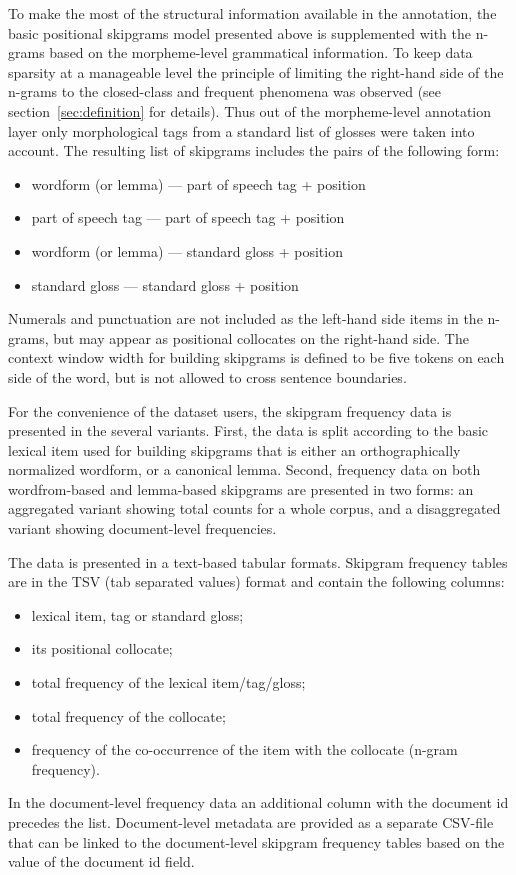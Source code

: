 \documentclass[12pt]{article}
\begin{document}
To make the most of the structural information available in the
annotation, the basic positional skipgrams model presented above is
supplemented with the n-grams based on the morpheme-level grammatical
information. To keep data sparsity at a manageable level the principle
of limiting the right-hand side of the n-grams to the closed-class and
frequent phenomena was observed (see section~\ref{sec:definition} for
details). Thus out of the morpheme-level annotation layer only
morphological tags from a standard list of glosses were taken into
account. The resulting list of skipgrams includes the pairs of the
following form:
\begin{itemize}
\item wordform (or lemma) — part of speech tag + position
\item part of speech tag — part of speech tag + position
\item wordform (or lemma) — standard gloss + position
\item standard gloss — standard gloss + position
\end{itemize}
Numerals and punctuation are not included as the left-hand side items
in the n-grams, but may appear as positional collocates on the
right-hand side.  The context window width for building skipgrams is
defined to be five tokens on each side of the word, but is not allowed
to cross sentence boundaries.

For the convenience of the dataset users, the skipgram frequency data
is presented in the several variants. First, the data is split
according to the basic lexical item used for building skipgrams that
is either an orthographically normalized wordform, or a canonical
lemma. Second, frequency data on both wordfrom-based and lemma-based
skipgrams are presented in two forms: an aggregated variant showing
total counts for a whole corpus, and a disaggregated variant showing
document-level frequencies. 

The data is presented in a text-based tabular formats. Skipgram
frequency tables are in the TSV (tab separated values) format and
contain the following columns:
\begin{itemize}
\item lexical item, tag or standard gloss;
\item its positional collocate;
\item total frequency of the lexical item/tag/gloss;
\item total frequency of the collocate;
\item frequency of the co-occurrence of the item with the collocate
  (n-gram frequency).
\end{itemize}
In the document-level frequency data an additional column with the
document id precedes the list.  Document-level metadata are provided
as a separate CSV-file that can be linked to the document-level
skipgram frequency tables based on the value of the document id
field. 
\end{document}
